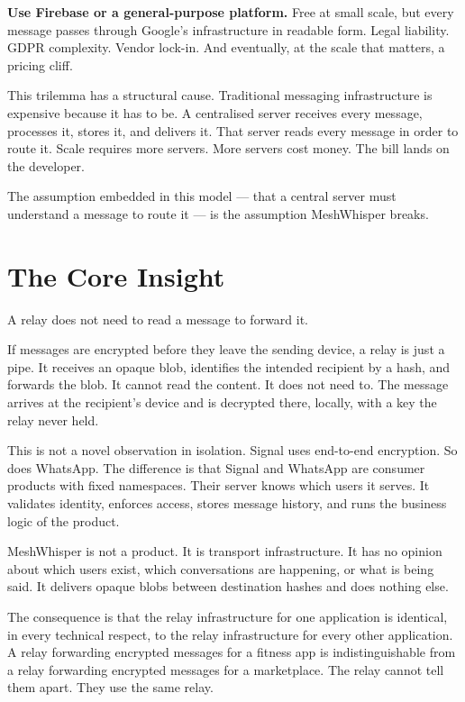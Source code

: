 \documentclass[11pt, a4paper]{article}
\begin{document}
\textbf{Use Firebase or a general-purpose platform.} Free at small scale, but every message passes through Google's infrastructure in readable form. Legal liability. GDPR complexity. Vendor lock-in. And eventually, at the scale that matters, a pricing cliff.

This trilemma has a structural cause. Traditional messaging infrastructure is expensive because it has to be. A centralised server receives every message, processes it, stores it, and delivers it. That server reads every message in order to route it. Scale requires more servers. More servers cost money. The bill lands on the developer.

The assumption embedded in this model — that a central server must understand a message to route it — is the assumption MeshWhisper breaks.

\section{The Core Insight}

A relay does not need to read a message to forward it.

If messages are encrypted before they leave the sending device, a relay is just a pipe. It receives an opaque blob, identifies the intended recipient by a hash, and forwards the blob. It cannot read the content. It does not need to. The message arrives at the recipient's device and is decrypted there, locally, with a key the relay never held.

This is not a novel observation in isolation. Signal uses end-to-end encryption. So does WhatsApp. The difference is that Signal and WhatsApp are consumer products with fixed namespaces. Their server knows which users it serves. It validates identity, enforces access, stores message history, and runs the business logic of the product.

MeshWhisper is not a product. It is transport infrastructure. It has no opinion about which users exist, which conversations are happening, or what is being said. It delivers opaque blobs between destination hashes and does nothing else.

The consequence is that the relay infrastructure for one application is identical, in every technical respect, to the relay infrastructure for every other application. A relay forwarding encrypted messages for a fitness app is indistinguishable from a relay forwarding encrypted messages for a marketplace. The relay cannot tell them apart. They use the same relay.
\end{document}
